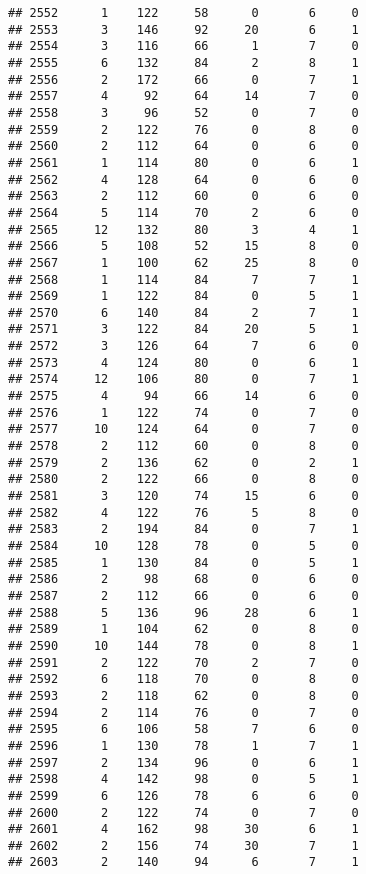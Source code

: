 \documentclass[
]{article}
\begin{document}
\begin{verbatim}
## 2552      1    122     58      0       6     0
## 2553      3    146     92     20       6     1
## 2554      3    116     66      1       7     0
## 2555      6    132     84      2       8     1
## 2556      2    172     66      0       7     1
## 2557      4     92     64     14       7     0
## 2558      3     96     52      0       7     0
## 2559      2    122     76      0       8     0
## 2560      2    112     64      0       6     0
## 2561      1    114     80      0       6     1
## 2562      4    128     64      0       6     0
## 2563      2    112     60      0       6     0
## 2564      5    114     70      2       6     0
## 2565     12    132     80      3       4     1
## 2566      5    108     52     15       8     0
## 2567      1    100     62     25       8     0
## 2568      1    114     84      7       7     1
## 2569      1    122     84      0       5     1
## 2570      6    140     84      2       7     1
## 2571      3    122     84     20       5     1
## 2572      3    126     64      7       6     0
## 2573      4    124     80      0       6     1
## 2574     12    106     80      0       7     1
## 2575      4     94     66     14       6     0
## 2576      1    122     74      0       7     0
## 2577     10    124     64      0       7     0
## 2578      2    112     60      0       8     0
## 2579      2    136     62      0       2     1
## 2580      2    122     66      0       8     0
## 2581      3    120     74     15       6     0
## 2582      4    122     76      5       8     0
## 2583      2    194     84      0       7     1
## 2584     10    128     78      0       5     0
## 2585      1    130     84      0       5     1
## 2586      2     98     68      0       6     0
## 2587      2    112     66      0       6     0
## 2588      5    136     96     28       6     1
## 2589      1    104     62      0       8     0
## 2590     10    144     78      0       8     1
## 2591      2    122     70      2       7     0
## 2592      6    118     70      0       8     0
## 2593      2    118     62      0       8     0
## 2594      2    114     76      0       7     0
## 2595      6    106     58      7       6     0
## 2596      1    130     78      1       7     1
## 2597      2    134     96      0       6     1
## 2598      4    142     98      0       5     1
## 2599      6    126     78      6       6     0
## 2600      2    122     74      0       7     0
## 2601      4    162     98     30       6     1
## 2602      2    156     74     30       7     1
## 2603      2    140     94      6       7     1

\end{verbatim}
\end{document}
